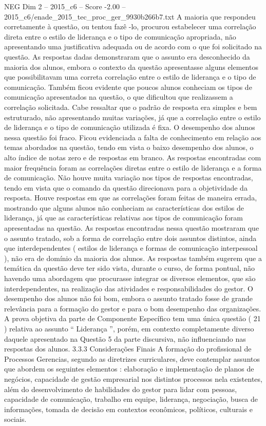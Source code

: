 \begin{textsample}{NEG Dim 2 – 2015\_c6 – Score -2.00 – 2015\_c6/enade\_2015\_tec\_proc\_ger\_9930b266b7.txt}
A maioria que respondeu corretamente à questão, ou tentou fazê -lo, procurou estabelecer uma correlação direta entre o estilo de liderança e o tipo de comunicação apropriada, não apresentando uma justificativa adequada ou de acordo com o que foi solicitado na questão.
As respostas dadas demonstraram que o assunto era desconhecido da maioria dos alunos, embora o contexto da questão apresentasse alguns elementos que possibilitavam uma correta correlação entre o estilo de liderança e o tipo de comunicação.
Também ficou evidente que poucos alunos conheciam os tipos de comunicação apresentados na questão, o que dificultou que realizassem a correlação solicitada.
Cabe ressaltar que o padrão de resposta era simples e bem estruturado, não apresentando muitas variações, já que a correlação entre o estilo de liderança e o tipo de comunicação utilizada é fixa.
O desempenho dos alunos nessa questão foi fraco.
Ficou evidenciada a falta de conhecimento em relação aos temas abordados na questão, tendo em vista o baixo desempenho dos alunos, o alto índice de notas zero e de respostas em branco.
As respostas encontradas com maior frequência foram as correlações diretas entre o estilo de liderança e a forma de comunicação.
Não houve muita variação nos tipos de respostas encontradas, tendo em vista que o comando da questão direcionava para a objetividade da resposta.
Houve respostas em que as correlações foram feitas de maneira errada, mostrando que alguns alunos não conheciam as características dos estilos de liderança, já que as características relativas aos tipos de comunicação foram apresentadas na questão.
As respostas encontradas nessa questão mostraram que o assunto tratado, sob a forma de correlação entre dois assuntos distintos, ainda que interdependentes ( estilos de liderança e formas de comunicação interpessoal ), não era de domínio da maioria dos alunos.
As respostas também sugerem que a temática da questão deve ter sido vista, durante o curso, de forma pontual, não havendo uma abordagem que procurasse integrar os diversos elementos, que são interdependentes, na realização das atividades e responsabilidades do gestor.
O desempenho dos alunos não foi bom, embora o assunto tratado fosse de grande relevância para a formação do gestor e para o bom desempenho das organizações.
A prova objetiva da parte de Componente Específico tem uma única questão ( 21 ) relativa ao assunto “ Liderança ”, porém, em contexto completamente diverso daquele apresentado na Questão 5 da parte discursiva, não influenciando nas respostas dos alunos. 3.3.3 Considerações Finais A formação do profissional de Processos Gerencias, segundo as diretrizes curriculares, deve contemplar assuntos que abordem os seguintes elementos : elaboração e implementação de planos de negócios, capacidade de gestão empresarial nos distintos processos nela existentes, além do desenvolvimento de habilidades do gestor para lidar com pessoas, capacidade de comunicação, trabalho em equipe, liderança, negociação, busca de informações, tomada de decisão em contextos econômicos, políticos, culturais e sociais.

\end{textsample}

